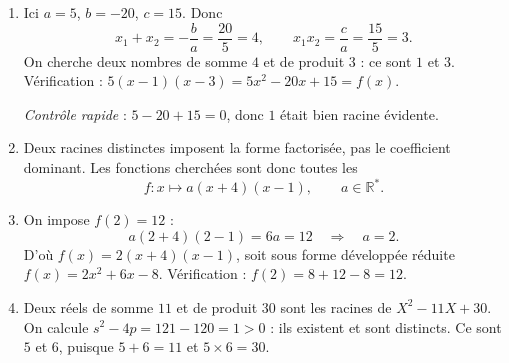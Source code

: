 

\begin{enumerate}
  \item Ici $a = 5$, $b = -20$, $c = 15$. Donc
        \[
          x_1 + x_2 = -\dfrac{b}{a} = \dfrac{20}{5} = 4,
          \qquad
          x_1 x_2 = \dfrac{c}{a} = \dfrac{15}{5} = 3 .
        \]
        On cherche deux nombres de somme $4$ et de produit $3$ : ce sont $1$ et
        $3$. Vérification : $5(x-1)(x-3) = 5x^2 - 20x + 15 = f(x)$.

        \emph{Contrôle rapide} : $5 - 20 + 15 = 0$, donc $1$ était bien racine
        évidente.

  \item Deux racines distinctes imposent la forme factorisée, pas le
        coefficient dominant. Les fonctions cherchées sont donc toutes les
        \[
          f : x \longmapsto a(x + 4)(x - 1), \qquad a \in \mathbb{R}^{*}.
        \]

  \item On impose $f(2) = 12$ :
        \[
          a(2 + 4)(2 - 1) = 6a = 12 \quad\Longrightarrow\quad a = 2 .
        \]
        D'où $f(x) = 2(x+4)(x-1)$, soit sous forme développée réduite
        $f(x) = 2x^2 + 6x - 8$. Vérification : $f(2) = 8 + 12 - 8 = 12$.

  \item Deux réels de somme $11$ et de produit $30$ sont les racines de
        $X^2 - 11X + 30$. On calcule $s^2 - 4p = 121 - 120 = 1 > 0$ : ils
        existent et sont distincts. Ce sont $5$ et $6$, puisque $5 + 6 = 11$ et
        $5 \times 6 = 30$.
\end{enumerate}
